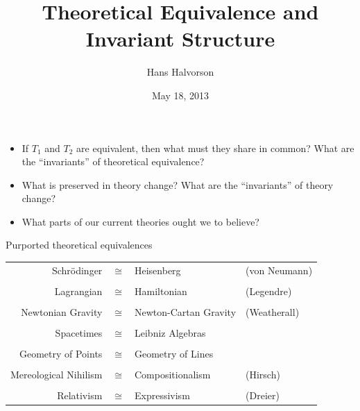 \documentclass{beamer}
\title{Theoretical Equivalence and Invariant Structure}
\author{Hans Halvorson}
\date{May 18, 2013}
\begin{document}
\def\2{\mathcal}
\def\7{\mathbb}
\begin{frame}


\maketitle

\end{frame}

\begin{frame}

\begin{itemize}
\item If $T_1$ and $T_2$ are equivalent, then what must they share in
  common?  What are the ``invariants'' of theoretical equivalence?
\item What is preserved in theory change?  What are the ``invariants''
  of theory change?
\item What parts of our current theories ought we to believe?
\end{itemize}
\end{frame}

\begin{frame}{Purported theoretical equivalences}

\begin{tabular}{rcll}
Schr\"odinger & $\cong$ & Heisenberg & (von Neumann) \\ \\ 
Lagrangian & $\cong$ & Hamiltonian & (Legendre) \\ \\ 
Newtonian Gravity & $\cong$ &   Newton-Cartan Gravity & (Weatherall) \\ \\ 
Spacetimes & $\cong$ & Leibniz Algebras \\ \\ 
Geometry of Points & $\cong$ & Geometry of Lines \\ \\ 
Mereological Nihilism & $\cong$ & Compositionalism & (Hirsch) \\ \\ 
Relativism & $\cong$ & Expressivism & (Dreier) \end{tabular}

\end{frame}
\end{document}
